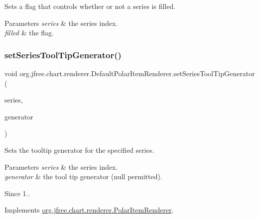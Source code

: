 Sets a flag that controls whether or not a series is filled.


\begin{DoxyParams}{Parameters}
{\em series} & the series index. \\
\hline
{\em filled} & the flag. \\
\hline
\end{DoxyParams}
\mbox{\label{classorg_1_1jfree_1_1chart_1_1renderer_1_1_default_polar_item_renderer_afd59a9fcaf9f825b6c86f04a29e9204d}} 
\subsubsection{\texorpdfstring{set\+Series\+Tool\+Tip\+Generator()}{setSeriesToolTipGenerator()}}
{\footnotesize\ttfamily void org.\+jfree.\+chart.\+renderer.\+Default\+Polar\+Item\+Renderer.\+set\+Series\+Tool\+Tip\+Generator (\begin{DoxyParamCaption}\item[{int}]{series,  }\item[{\mbox{\hyperlink{interfaceorg_1_1jfree_1_1chart_1_1labels_1_1_x_y_tool_tip_generator}{X\+Y\+Tool\+Tip\+Generator}}}]{generator }\end{DoxyParamCaption})}

Sets the tooltip generator for the specified series.


\begin{DoxyParams}{Parameters}
{\em series} & the series index. \\
\hline
{\em generator} & the tool tip generator ({\ttfamily null} permitted).\\
\hline
\end{DoxyParams}
\begin{DoxySince}{Since}
1.. 
\end{DoxySince}


Implements \mbox{\hyperlink{interfaceorg_1_1jfree_1_1chart_1_1renderer_1_1_polar_item_renderer_a38f9cc455c80c0b6e937bd759a62e3a2}{org.\+jfree.\+chart.\+renderer.\+Polar\+Item\+Renderer}}.

